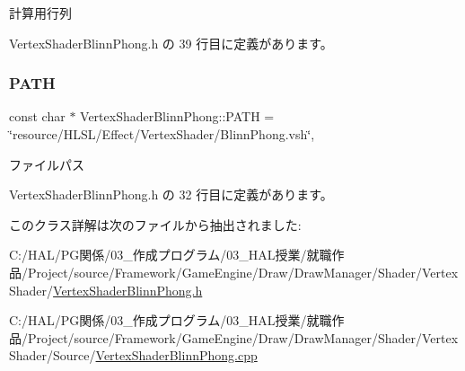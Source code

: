 計算用行列 



 Vertex\+Shader\+Blinn\+Phong.\+h の 39 行目に定義があります。

\mbox{\label{class_vertex_shader_blinn_phong_a7b721175a17910728b9d2b887f567730}} 
\subsubsection{\texorpdfstring{P\+A\+TH}{PATH}}
{\footnotesize\ttfamily const char $\ast$ Vertex\+Shader\+Blinn\+Phong\+::\+P\+A\+TH = \char`\"{}resource/H\+L\+SL/Effect/Vertex\+Shader/Blinn\+Phong.\+vsh\char`\"{}\hspace{0.3cm}{\ttfamily [static]}, {\ttfamily [private]}}



ファイルパス 



 Vertex\+Shader\+Blinn\+Phong.\+h の 32 行目に定義があります。



このクラス詳解は次のファイルから抽出されました\+:\begin{DoxyCompactItemize}
\item 
C\+:/\+H\+A\+L/\+P\+G関係/03\+\_\+作成プログラム/03\+\_\+\+H\+A\+L授業/就職作品/\+Project/source/\+Framework/\+Game\+Engine/\+Draw/\+Draw\+Manager/\+Shader/\+Vertex\+Shader/\mbox{\hyperlink{_vertex_shader_blinn_phong_8h}{Vertex\+Shader\+Blinn\+Phong.\+h}}\item 
C\+:/\+H\+A\+L/\+P\+G関係/03\+\_\+作成プログラム/03\+\_\+\+H\+A\+L授業/就職作品/\+Project/source/\+Framework/\+Game\+Engine/\+Draw/\+Draw\+Manager/\+Shader/\+Vertex\+Shader/\+Source/\mbox{\hyperlink{_vertex_shader_blinn_phong_8cpp}{Vertex\+Shader\+Blinn\+Phong.\+cpp}}\end{DoxyCompactItemize}

